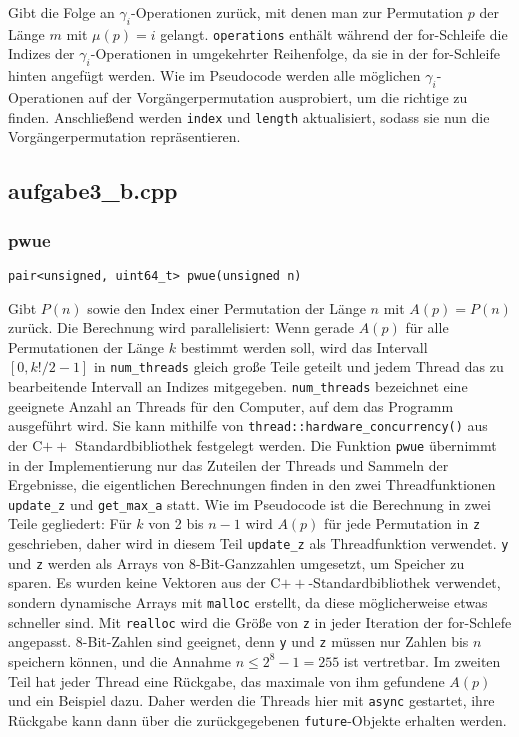 \documentclass[a4paper, 10pt, ngerman]{article}
\begin{document}
\noindent Gibt die Folge an $\gamma_i$-Operationen zurück, mit denen man zur Permutation $p$ der Länge $m$ mit $\mu(p) = i$ gelangt. \verb|operations| enthält während der for-Schleife die Indizes der $\gamma_i$-Operationen in umgekehrter Reihenfolge, da sie in der for-Schleife hinten angefügt werden. Wie im Pseudocode werden alle möglichen $\gamma_i$-Operationen auf der Vorgängerpermutation ausprobiert, um die richtige zu finden. Anschließend werden \verb|index| und \verb|length| aktualisiert, sodass sie nun die Vorgängerpermutation repräsentieren.

\subsection{aufgabe3\_b.cpp}

\subsubsection{pwue}
\verb|pair<unsigned, uint64_t> pwue(unsigned n)|
\medskip

\noindent Gibt $P(n)$ sowie den Index einer Permutation der Länge $n$ mit $A(p) = P(n)$ zurück. Die Berechnung wird parallelisiert: Wenn gerade $A(p)$ für alle Permutationen der Länge $k$ bestimmt werden soll, wird das Intervall $[0, k!/2 - 1]$ in \verb|num_threads| gleich große Teile geteilt und jedem Thread das zu bearbeitende Intervall an Indizes mitgegeben. \verb|num_threads| bezeichnet eine geeignete Anzahl an Threads für den Computer, auf dem das Programm ausgeführt wird. Sie kann mithilfe von \verb|thread::hardware_concurrency()| aus der C$++$ Standardbibliothek festgelegt werden. Die Funktion \verb|pwue| übernimmt in der Implementierung nur das Zuteilen der Threads und Sammeln der Ergebnisse, die eigentlichen Berechnungen finden in den zwei Threadfunktionen \verb|update_z| und \verb|get_max_a| statt. Wie im Pseudocode ist die Berechnung in zwei Teile gegliedert: Für $k$ von 2 bis $n - 1$ wird $A(p)$ für jede Permutation in \verb|z| geschrieben, daher wird in diesem Teil \verb|update_z| als Threadfunktion verwendet. \verb|y| und \verb|z| werden als Arrays von 8-Bit-Ganzzahlen umgesetzt, um Speicher zu sparen. Es wurden keine Vektoren aus der C$++$-Standardbibliothek verwendet, sondern dynamische Arrays mit \verb|malloc| erstellt, da diese möglicherweise etwas schneller sind. Mit \verb|realloc| wird die Größe von \verb|z| in jeder Iteration der for-Schlefe angepasst. 8-Bit-Zahlen sind geeignet, denn \verb|y| und \verb|z| müssen nur Zahlen bis $n$ speichern können, und die Annahme $n \le 2^8 - 1 = 255$ ist vertretbar. Im zweiten Teil hat jeder Thread eine Rückgabe, das maximale von ihm gefundene $A(p)$ und ein Beispiel dazu. Daher werden die Threads hier mit \verb|async| gestartet, ihre Rückgabe kann dann über die zurückgegebenen \verb|future|-Objekte erhalten werden.
\end{document}
